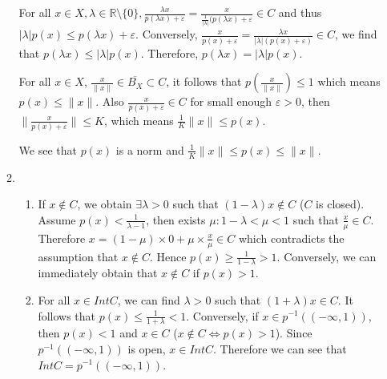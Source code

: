 \begin{enumerate}
\begin{answer}
\begin{enumerate}
        For all $ x \in X, \lambda\in \mathbb R\setminus \{0\}, \frac{\lambda x}{p(\lambda x) + \varepsilon} = \frac{x}{\frac{1}{|\lambda|}(p(\lambda x) + \varepsilon}\in C$ and thus $|\lambda|p(x)\leq p(\lambda x) + \varepsilon$. Conversely, $\frac{x}{p(x) + \varepsilon} = \frac{\lambda x}{|\lambda|(p(x) + \varepsilon)}\in C$, we find that $p(\lambda x)\leq |\lambda|p(x)$. Therefore, $p(\lambda x) = |\lambda|p(x)$.
    
        For all $x\in X$, $\frac{x}{\|x\|}\in \overline{B_X}\subset C$, it follows that $p(\frac{x}{\|x\|})\leq 1$ which means $p(x)\leq \|x\|$. Also $\frac{x}{p(x) + \varepsilon}\in C$ for small enough $\varepsilon > 0$, then $\|\frac{x}{p(x) + \varepsilon}\|\leq K$, which means $\frac1K\|x\|\leq p(x)$.
    
        We see that $p(x)$ is a norm and $\frac1K\|x\|\leq p(x)\leq \|x\|$.
        \item \begin{enumerate}
            \item If $x\notin C$, we obtain $\exists \lambda > 0$ such that $(1-\lambda) x\notin C$ ($C$ is closed). Assume $p(x)<\frac1{\lambda-1}$, then exists $\mu : 1-\lambda < \mu <1$ such that $\frac x \mu\in C$. Therefore $x = (1-\mu)\times0 + \mu\times\frac{x}{\mu}\in C$ which contradicts the assumption that $x\notin C$. Hence $p(x) \geq \frac1{1-\lambda}>1$. Conversely, we can immediately obtain that $x\notin C$ if $p(x) > 1$.
    
            \item For all $x\in Int C$, we can find $\lambda > 0$ such that $(1+\lambda)x\in C$. It follows that $p(x) \leq \frac1{1+\lambda} < 1$. Conversely, if $x\in p^{-1}((-\infty, 1))$, then $p(x) < 1$ and $x\in C$ ($x\notin C\iff p(x) > 1$). Since $p^{-1}((-\infty, 1))$ is open, $x\in Int C$. Therefore we can see that $Int C = p^{-1}((-\infty, 1))$.
    

\end{enumerate}
\end{enumerate}
\end{answer}
\end{enumerate}
